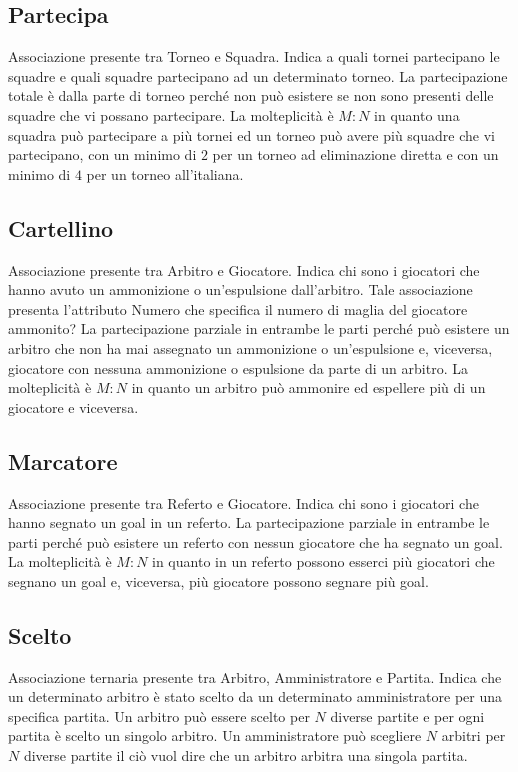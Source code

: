	\subsection{Partecipa}
	Associazione presente tra Torneo e Squadra.
	Indica a quali tornei partecipano le squadre e quali squadre partecipano ad un determinato torneo.
	La partecipazione totale è dalla parte di torneo perché non può esistere se non sono presenti delle squadre che vi possano partecipare.
	La molteplicità è $M:N$ in quanto una squadra può partecipare a più tornei ed un torneo può avere più squadre che vi partecipano, con un minimo di $2$ per un torneo ad eliminazione diretta e con un minimo di $4$ per un torneo all’italiana.
	
	\subsection{Cartellino}
	Associazione presente tra Arbitro e Giocatore.
	Indica chi sono i giocatori che hanno avuto un ammonizione o un'espulsione dall'arbitro.
	Tale associazione presenta l’attributo Numero che specifica il numero di maglia del giocatore ammonito?
	La partecipazione parziale in entrambe le parti perché può esistere un arbitro che non ha mai assegnato un ammonizione o un'espulsione e, viceversa, giocatore con nessuna ammonizione o espulsione da parte di un arbitro.
	La molteplicità è $M:N$ in quanto un arbitro può ammonire ed espellere più di un giocatore e viceversa.
	
	\subsection{Marcatore}
	Associazione presente tra Referto e Giocatore.
	Indica chi sono i giocatori che hanno segnato un goal in un referto.
	La partecipazione parziale in entrambe le parti perché può esistere un referto con nessun giocatore che ha segnato un goal.
	La molteplicità è $M:N$ in quanto in un referto possono esserci più giocatori che segnano un goal e, viceversa, più giocatore possono segnare più goal.
	
	\subsection{Scelto}
	Associazione ternaria presente tra Arbitro, Amministratore e Partita.
	Indica che un determinato arbitro è stato scelto da un determinato amministratore per una specifica partita.
	Un arbitro può essere scelto per $N$ diverse partite e per ogni partita è scelto un singolo arbitro. Un amministratore può scegliere $N$ arbitri per $N$ diverse partite il ciò vuol dire che un arbitro arbitra una singola partita.
	
